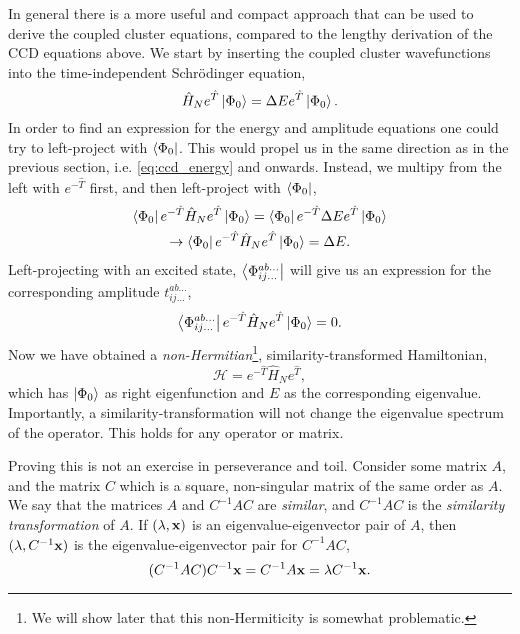 In general there is a more useful and compact approach that can be used to derive 
the coupled cluster equations, compared to the lengthy derivation of the CCD 
equations above. We start by inserting the coupled cluster wavefunctions into the 
time-independent Schrödinger equation,
\begin{equation}
    \hat{H}_Ne^{\hat{T}}\ket{\Phi_0} = \Delta E e^{\hat{T}}\ket{\Phi_0}.
\end{equation} 
In order to find an expression for the energy and amplitude equations one could 
try to left-project with $\bra{\Phi_0}$. This would propel us in the same 
direction as in the previous section, i.e. \autoref{eq:ccd_energy} and onwards.
Instead, we multipy 
from the left with $e^{-\hat{T}}$ first, and then left-project with $\bra{\Phi_0}$,
\begin{equation}
    \label{eq:cc_energy}
    \begin{gathered}
    \bra{\Phi_0} e^{-\hat{T}}\hat{H}_Ne^{\hat{T}} \ket{\Phi_0} 
    = \bra{\Phi_0} e^{-\hat{T}} \Delta E e^{\hat{T}} \ket{\Phi_0} \\
    \to \bra{\Phi_0} e^{-\hat{T}} \hat{H}_N e^{\hat{T}} \ket{\Phi_0}
    = \Delta E.
    \end{gathered}
\end{equation}
Left-projecting with an excited state, $\bra{\Phi^{ab\dots}_{ij\dots}}$ will give us 
an expression for the corresponding amplitude $t^{ab\dots}_{ij\dots}$,
\begin{equation}
    \label{eq:cc_amplitude}
    \bra{\Phi^{ab\dots}_{ij\dots}} e^{-\hat{T}}\hat{H}_Ne^{\hat{T}}\ket{\Phi_0} = 0.
\end{equation}
Now we have obtained a \emph{non-Hermitian}\footnote{We will show later that this 
non-Hermiticity is somewhat problematic.}, similarity-transformed Hamiltonian,
\begin{equation}
    \mathscr{H} = e^{-\hat{T}}\hat{H}_Ne^{\hat{T}},
\end{equation}
which has $\ket{\Phi_0}$ as right eigenfunction and $E$ as the corresponding eigenvalue.
Importantly, a similarity-transformation will not change the eigenvalue spectrum of the 
operator. This holds for any operator or matrix. 

Proving this is not an exercise in perseverance and toil.
Consider some matrix $A$, and the matrix $C$ which is a square, non-singular 
matrix of the same order as $A$. We say that the matrices $A$ and
$C^{-1}AC$ are \emph{similar}, and $C^{-1}AC$ is the \emph{similarity transformation}
of $A$. If $(\lambda, \vb{x})$ is an
eigenvalue-eigenvector pair of $A$, then $(\lambda, C^{-1}\vb{x})$ is the 
eigenvalue-eigenvector pair for $C^{-1}AC$,
\begin{equation}
    (C^{-1}AC)C^{-1}\vb{x} = C^{-1}A\vb{x} = \lambda C^{-1}\vb{x}.
\end{equation}

